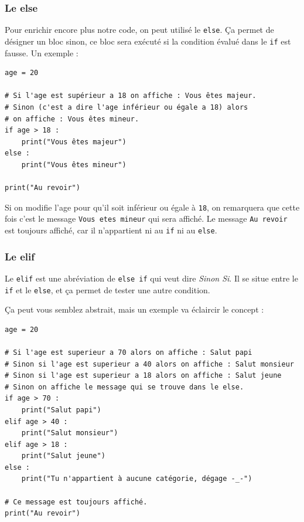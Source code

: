 \documentclass[12pt]{article}
\newcommand{\code}[1]{\colorbox{light-gray}{\texttt{#1}}}
\begin{document}
        \subsubsection{Le else}
            Pour enrichir encore plus notre code, on peut utilisé le \code{else}. Ça permet de désigner un bloc sinon, ce
            bloc sera exécuté si la condition évalué dans le \code{if} est fausse. Un exemple :
            \begin{lstlisting}[style=code, breaklines=false]
age = 20

# Si l'age est supérieur a 18 on affiche : Vous êtes majeur.
# Sinon (c'est a dire l'age inférieur ou égale a 18) alors 
# on affiche : Vous êtes mineur.
if age > 18 :
    print("Vous êtes majeur")
else :
    print("Vous êtes mineur")

print("Au revoir")
            \end{lstlisting}

            Si on modifie l'age pour qu'il soit inférieur ou égale à \code{18}, on remarquera que cette fois c'est le message 
            \code{Vous etes mineur} qui sera affiché. Le message \code{Au revoir} est toujours affiché, car il n'appartient
            ni au \code{if} ni au \code{else}.

        \subsubsection{Le elif}
            Le \code{elif} est une abréviation de \code{else if} qui veut dire \emph{Sinon Si}. Il se situe entre le 
            \code{if} et le \code{else}, et ça permet de tester une autre condition.

            Ça peut vous semblez abstrait, mais un exemple va éclaircir le concept :
            \begin{lstlisting}[style=code, breaklines=false]
age = 20

# Si l'age est superieur a 70 alors on affiche : Salut papi
# Sinon si l'age est superieur a 40 alors on affiche : Salut monsieur
# Sinon si l'age est superieur a 18 alors on affiche : Salut jeune
# Sinon on affiche le message qui se trouve dans le else.
if age > 70 :
    print("Salut papi")
elif age > 40 :
    print("Salut monsieur")
elif age > 18 :
    print("Salut jeune")
else :
    print("Tu n'appartient à aucune catégorie, dégage -_-")

# Ce message est toujours affiché.
print("Au revoir")
                
            \end{lstlisting}
\end{document}

